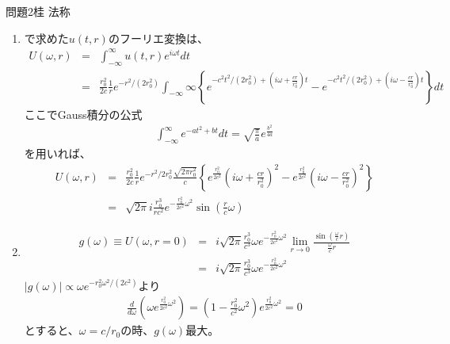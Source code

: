 \documentclass[fleqn]{jbook}
\begin{document}
\begin{answer}{問題2}{桂 法称}
\begin{enumerate}
\item {}で求めた$u(t, r)$のフーリエ変換は、
\begin{eqnarray*}
U(\omega, r) &=& \int_{-\infty}^{\infty} u(t, r)e^{i\omega t}dt \\
&=& \frac{r_0^2}{2c}\frac{1}{r}e^{-r^2/(2r_0^2)}
\int_{-\infty}{\infty}\left\{ e^{-c^2t^2/(2r_0^2) + 
(i \omega + \frac{cr}{r_0^2})t}-e^{-c^2t^2/(2r_0^2) + 
(i \omega - \frac{cr}{r_0^2})t}\right\} dt
\end{eqnarray*}
ここでGauss積分の公式
\begin{eqnarray*}
\int_{-\infty}^{\infty}e^{-at^2 + bt}dt = \sqrt{\frac{\pi}{a}}
e^{\frac{b^2}{4a}}
\end{eqnarray*}
を用いれば、
\begin{eqnarray*}
U(\omega, r) &=& \frac{r_0^2}{2c}\frac{1}{r}e^{-r^2/2r_0^2}
\frac{\sqrt{2 \pi r_0^2}}{c}\left\{ e^{\frac{r_0^2}{2c^2}}
(i \omega + \frac{cr}{r_0^2})^2 
- e^{\frac{r_0^2}{2c^2}}(i \omega - \frac{cr}{r_0^2})^2 \right\} \\
&=& \sqrt{2 \pi}i \frac{r_0^3}{r c^2}e^{-\frac{r_0^2}{2c^2}\omega^2}
\sin (\frac{r}{c}\omega)
\end{eqnarray*}

\item \begin{eqnarray*}
g(\omega) \equiv U(\omega, r=0) &=& i \sqrt{2 \pi}\frac{r_0^3}{c^3}
\omega e^{-\frac{r_0^2}{2c^2}\omega^2 }\lim_{r \rightarrow 0}
\frac{\sin(\frac{\omega}{c}r)}{\frac{\omega}{c}r} \\
&=& i \sqrt{2 \pi}\frac{r_0^3}{c^3}
\omega e^{-\frac{r_0^2}{2c^2}\omega^2} 
\end{eqnarray*}
$|g(\omega)| \propto \omega e^{-r_0^2\omega^2/(2c^2)}$より
\begin{eqnarray*}
\frac{d}{d\omega}\left( \omega e^{\frac{r_0^2}{2c^2}\omega^2} \right)
= \left( 1 - \frac{r_0^2}{c^2}\omega^2 \right)
e^{\frac{r_0^2}{2c^2}\omega^2} = 0
\end{eqnarray*}
とすると、$\omega = c/r_0$の時、$g(\omega)$最大。

\end{enumerate}
\end{answer}
\end{document}
